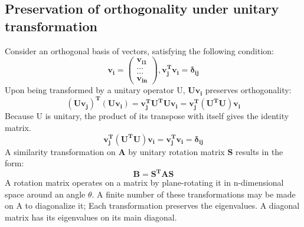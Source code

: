 \documentclass[10pt,showpacs,preprintnumbers,footinbib,amsmath,amssymb,aps,prl,twocolumn,groupedaddress,superscriptaddress,showkeys]{revtex4-1}
\begin{document}
	\subsection{Preservation of orthogonality under unitary transformation}	
Consider an orthogonal basis of vectors, satisfying the following condition:\begin{equation} \mathbf{v_{i} =\begin{pmatrix}
			v_{i1} \\
			... \\
			... \\
			v_{in} 
		\end{pmatrix}}, \mathbf{v_{j}^{T}v_{i} = \delta_{ij}} \end{equation} Upon being transformed by a unitary operator U, $\mathbf{Uv_{i}}$  preserves orthogonality: \begin{equation}
	 \mathbf{(Uv_{j})^{T}(Uv_{i})= v_{j}^{T}U^{T}Uv_{i}  = v_{j}^{T}(U^{T}U)v_{i}} 
	\end{equation}
Because U is unitary, the product of its transpose with itself gives the identity matrix.
	\begin{equation}
	\mathbf {v_{j}^{T}(U^{T}U)v_{i} = v_{j}^{T}v_{i} = \delta_{ij}}
	\end{equation}
A similarity transformation on ${\mathbf A}$ by unitary rotation matrix ${\mathbf S}$ results in the form:
	\begin{equation}
	\mathbf {B = S^{T}AS}
	\end{equation}
A rotation matrix operates on a matrix by plane-rotating it in n-dimensional space around an angle ${\theta}$. A finite number of these transformations may be made on A to diagonalize it; Each transformation preserves the eigenvalues. A diagonal matrix has its eigenvalues on its main diagonal.
\end{document}

